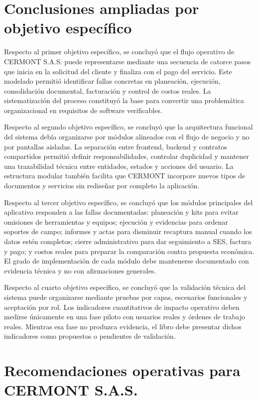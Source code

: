 \section{Conclusiones ampliadas por objetivo específico}
\label{sec:conclusiones-ampliadas-objetivos}

Respecto al primer objetivo específico, se concluyó que el flujo operativo de CERMONT S.A.S. puede representarse mediante una secuencia de catorce pasos que inicia en la solicitud del cliente y finaliza con el pago del servicio. Este modelado permitió identificar fallas concretas en planeación, ejecución, consolidación documental, facturación y control de costos reales. La sistematización del proceso constituyó la base para convertir una problemática organizacional en requisitos de software verificables.

Respecto al segundo objetivo específico, se concluyó que la arquitectura funcional del sistema debía organizarse por módulos alineados con el flujo de negocio y no por pantallas aisladas. La separación entre frontend, backend y contratos compartidos permitió definir responsabilidades, controlar duplicidad y mantener una trazabilidad técnica entre entidades, estados y acciones del usuario. La estructura modular también facilita que CERMONT incorpore nuevos tipos de documentos y servicios sin rediseñar por completo la aplicación.

Respecto al tercer objetivo específico, se concluyó que los módulos principales del aplicativo responden a las fallas documentadas: planeación y kits para evitar omisiones de herramientas y equipos; ejecución y evidencias para ordenar soportes de campo; informes y actas para disminuir recaptura manual cuando los datos estén completos; cierre administrativo para dar seguimiento a SES, factura y pago; y costos reales para preparar la comparación contra propuesta económica. El grado de implementación de cada módulo debe mantenerse documentado con evidencia técnica y no con afirmaciones generales.

Respecto al cuarto objetivo específico, se concluyó que la validación técnica del sistema puede organizarse mediante pruebas por capas, escenarios funcionales y aceptación por rol. Los indicadores cuantitativos de impacto operativo deben medirse únicamente en una fase piloto con usuarios reales y órdenes de trabajo reales. Mientras esa fase no produzca evidencia, el libro debe presentar dichos indicadores como propuestos o pendientes de validación.

\section{Recomendaciones operativas para CERMONT S.A.S.}
\label{sec:recomendaciones-operativas-cermont}

